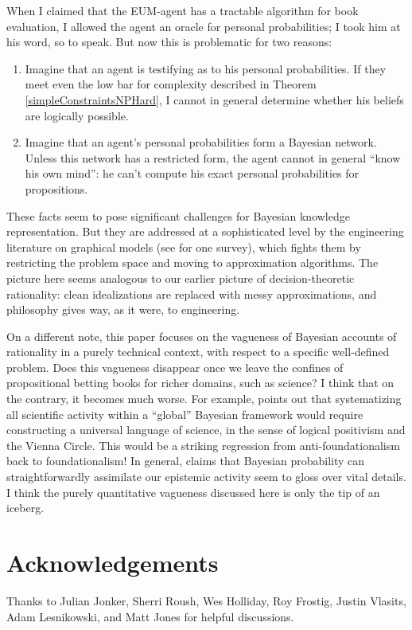 \documentclass[letterpaper,12pt]{article}
\begin{document}
When I claimed that the EUM-agent has a tractable algorithm for book evaluation, I allowed the agent an oracle for personal probabilities; I took him at his word, so to speak. But now this is problematic for two reasons:
\begin{enumerate}
\item
Imagine that an agent is testifying as to his personal probabilities. If they meet even the low bar for complexity described in Theorem \ref{simpleConstraintsNPHard}, I cannot in general determine whether his beliefs are logically possible.
\item
Imagine that an agent's personal probabilities form a Bayesian network. Unless this network has a restricted form, the agent cannot in general ``know his own mind'': he can't compute his exact personal probabilities for propositions.
\end{enumerate}

These facts seem to pose significant challenges for Bayesian knowledge representation. But they are addressed at a sophisticated level by the engineering literature on graphical models (see \cite{citeulike:3470282} for one survey), which fights them by restricting the problem space and moving to approximation algorithms. The picture here seems analogous to our earlier picture of decision-theoretic rationality: clean idealizations are replaced with messy approximations, and philosophy gives way, as it were, to engineering.

On a different note, this paper focuses on the vagueness of Bayesian accounts of rationality in a purely technical context, with respect to a specific well-defined problem. Does this vagueness disappear once we leave the confines of propositional betting books for richer domains, such as science? I think that on the contrary, it becomes much worse. For example, \cite{garber1983} points out that systematizing all scientific activity within a ``global'' Bayesian framework would require constructing a universal language of science, in the sense of logical positivism and the Vienna Circle. This would be a striking regression from anti-foundationalism back to foundationalism! In general, claims that Bayesian probability can straightforwardly assimilate our epistemic activity seem to gloss over vital details. I think the purely quantitative vagueness discussed here is only the tip of an iceberg.

\section{Acknowledgements}
Thanks to Julian Jonker, Sherri Roush, Wes Holliday, Roy Frostig, Justin Vlasits, Adam Lesnikowski, and Matt Jones for helpful discussions.


\end{document}

